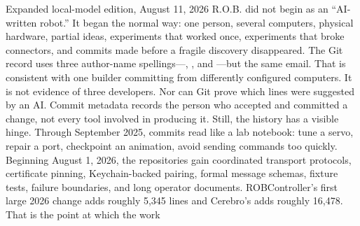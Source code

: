 \markdownRendererDocumentBegin
\markdownRendererSectionBegin
{}\markdownRendererInterblockSeparator
{}\markdownRendererSectionBegin
{}\markdownRendererInterblockSeparator
{}\markdownRendererHardLineBreak
{}Expanded local-model edition, August 11, 2026\markdownRendererInterblockSeparator
{}\markdownRendererThematicBreak{}\markdownRendererInterblockSeparator
{}
\markdownRendererSectionEnd \markdownRendererSectionBegin
{}\markdownRendererInterblockSeparator
{}R.O.B. did not begin as an “AI-written robot.” It began the normal way: one\markdownRendererSoftLineBreak
{}person, several computers, physical hardware, partial ideas, experiments that\markdownRendererSoftLineBreak
{}worked once, experiments that broke connectors, and commits made before a\markdownRendererSoftLineBreak
{}fragile discovery disappeared.\markdownRendererParagraphSeparator
{}The Git record uses three author-name spellings—, , and\markdownRendererSoftLineBreak
{}—but the same  email. That is\markdownRendererSoftLineBreak
{}consistent with one builder committing from differently configured computers.\markdownRendererSoftLineBreak
{}It is not evidence of three developers. Nor can Git prove which lines were\markdownRendererSoftLineBreak
{}suggested by an AI. Commit metadata records the person who accepted and\markdownRendererSoftLineBreak
{}committed a change, not every tool involved in producing it.\markdownRendererParagraphSeparator
{}Still, the history has a visible hinge. Through September 2025, commits read\markdownRendererSoftLineBreak
{}like a lab notebook: tune a servo, repair a port, checkpoint an animation,\markdownRendererSoftLineBreak
{}avoid sending commands too quickly. Beginning August 1, 2026, the repositories\markdownRendererSoftLineBreak
{}gain coordinated transport protocols, certificate pinning, Keychain-backed\markdownRendererSoftLineBreak
{}pairing, formal message schemas, fixture tests, failure boundaries, and long\markdownRendererSoftLineBreak
{}operator documents. ROBController's first large 2026 change adds roughly 5,345\markdownRendererSoftLineBreak
{}lines and Cerebro's adds roughly 16,478. That is the point at which the work\markdownRendererSoftLineBreak
